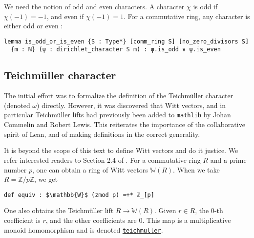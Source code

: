 \documentclass[a4paper,UKenglish,cleveref, autoref, thm-restate,pdfa]{lipics-v2021}
\newcommand{\lean}[1]{\texttt{#1}\xspace} %
\begin{document}
We need the notion of odd and even characters. A character $\chi$ is odd if $\chi (-1) = -1$, and 
even if $\chi (-1) = 1$. For a commutative ring, any character is either odd or even : 
\begin{lstlisting}
lemma is_odd_or_is_even {S : Type*} [comm_ring S] [no_zero_divisors S] 
  {m : ℕ} (ψ : dirichlet_character S m) : ψ.is_odd ∨ ψ.is_even
\end{lstlisting}
\subsection{Teichmüller character}
The initial effort was to formalize the definition of the Teichmüller character (denoted $\omega$) directly. 
However, it was discovered that Witt vectors, and in particular Teichmüller lifts had previously 
been added to \lean{mathlib} by Johan Commelin and Robert Lewis. This reiterates the importance 
of the collaborative spirit of Lean, and of making definitions in the correct generality. 

It is beyond the scope of this text to define Witt vectors and do it justice. We refer interested readers to 
Section 2.4 of \cite{witt}. For a commutative ring $R$ and a prime number $p$, one can obtain a ring of Witt vectors $\mathbb{W}(R)$.
When we take $R = \mathbb{Z}/p \mathbb{Z}$, we get 
\begin{lstlisting}
def equiv : $\mathbb{W}$ (zmod p) ≃+* ℤ_[p]
\end{lstlisting}
One also obtains the Teichmüller lift $R \to \mathbb{W} (R)$. Given $r \in R$, 
the 0-th coefficient is $r$, and the other coefficients are 0. This map is a 
multiplicative monoid homomorphism and is denoted 
\href{https://leanprover-community.github.io/mathlib_docs/ring_theory/witt_vector/teichmuller.html#witt_vector.teichmuller}{\lean{teichmuller}}. 
\end{document}

